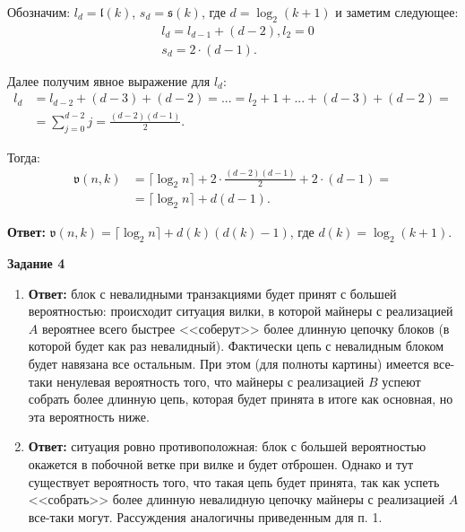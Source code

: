 \documentclass[12pt, a4paper]{extarticle}
\newenvironment*{dummyenv}{}{}
\newcommand{\mysection}[1]{
    \addcontentsline{toc}{section}{#1}
    \begin{dummyenv}
        \bfseries\large #1
    \end{dummyenv}
}
\newcommand{\Answer}[1]{\textbf{Ответ:} #1}
\begin{document}
\begin{enumerate}
        Обозначим: $l_{d} = \mathfrak{l}(k)$, $s_d = \mathfrak{s}(k)$, где $d = \log_2(k + 1)$ и 
        заметим следующее:
        \begin{equation}
        \begin{split}
            & l_d = l_{d - 1} + (d - 2), l_2 = 0 \\
            & s_d = 2 \cdot (d - 1).
        \end{split}
        \end{equation}
        
        Далее получим явное выражение для $l_d$:
        \begin{equation}
        \begin{split}
            l_d & = l_{d - 2} + (d - 3) + (d - 2) = ... = l_2 + 1 + ... + (d - 3) + (d - 2) = \\
            & = \sum_{j = 0}^{d - 2} j = \frac{(d - 2)(d - 1)}{2}.
        \end{split}
        \end{equation}
        
        Тогда:
        \begin{equation}
        \begin{split}
            \mathfrak{v}(n, k) & = \lceil \log_2 n \rceil + 2 \cdot \frac{(d - 2)(d - 1)}{2} + 
                2 \cdot (d - 1) = \\
            & = \lceil \log_2 n \rceil + d (d - 1).
        \end{split}
        \end{equation}
        
        \Answer{$\mathfrak{v}(n, k) = \lceil \log_2 n \rceil + d(k) (d(k) - 1)$, где 
            $d(k) = \log_2(k + 1)$.}
\end{enumerate}

\mysection{Задание 4}

\begin{enumerate}
    \item \Answer{блок с невалидными транзакциями будет принят с большей вероятностью: происходит 
        ситуация вилки, в которой майнеры с реализацией $A$ вероятнее всего быстрее <<соберут>>
        более длинную цепочку блоков (в которой будет как раз невалидный). Фактически цепь с
        невалидным блоком будет навязана все остальным. При этом (для полноты картины) имеется 
        все-таки ненулевая вероятность того, что майнеры с реализацией $B$ успеют собрать более
        длинную цепь, которая будет принята в итоге как основная, но эта вероятность ниже.
    }
    
    \item \Answer{ситуация ровно противоположная: блок с большей вероятностью окажется в
        побочной ветке при вилке и будет отброшен. Однако и тут существует вероятность того,
        что такая цепь будет принята, так как успеть <<собрать>> более длинную невалидную цепочку
        майнеры с реализацией $A$ все-таки могут. Рассуждения аналогичны приведенным для п. 1.
    }
\end{enumerate}
\end{document}
